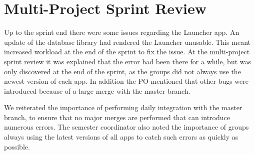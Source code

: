 \section{Multi-Project Sprint Review}\label{sec:s3_multiprj_review}
Up to the sprint end there were some issues regarding the Launcher app. An update of the database library had rendered the Launcher unusable. This meant increased workload at the end of the sprint to fix the issue. At the multi-project sprint review it was explained that the error had been there for a while, but was only discovered at the end of the sprint, as the \gui groups did not always use the newest version of each app. In addition the \db PO mentioned that other bugs were introduced because of a large merge with the master branch.

We reiterated the importance of performing daily integration with the master branch, to ensure that no major merges are performed that can introduce numerous errors. The semester coordinator also noted the importance of \gui groups always using the latest versions of all apps to catch such errors as quickly as possible.
